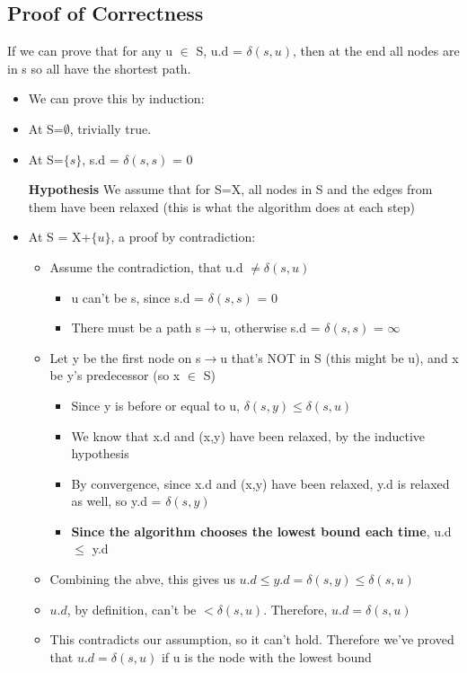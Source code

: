 \newpage
\subsection{Proof of Correctness}
If we can prove that for any u $\in$ S, u.d = $\delta(s,u)$, then at the end all nodes are in s so all have the shortest path.
\begin{itemize}
    \item We can prove this by induction:
    \item At S=$\emptyset$, trivially true.
    \item At S=$\{s\}$, s.d = $\delta(s,s)$ = 0
    \item [\textbf{Hypothesis}]We assume that for S=X, all nodes in S and the edges from them have been relaxed (this is what the algorithm does at each step)
    \item At S = X+$\{u\}$, a proof by contradiction:
    \begin{itemize}
        \item Assume the contradiction, that u.d $\neq \delta(s,u)$
        \begin{itemize}
            \item u can't be s, since s.d = $\delta(s,s)$ = 0
            \item There must be a path s$\rightarrow$u, otherwise s.d = $\delta(s,s)$ = $\infty$
        \end{itemize}
        \item Let y be the first node on s$\rightarrow$u that's NOT in S (this might be u), and x be y's predecessor (so x $\in$ S)
        \begin{itemize}
            \item Since y is before or equal to u, $\delta(s,y) \leq \delta(s,u)$
            \item We know that x.d and (x,y) have been relaxed, by the inductive hypothesis
            \item By convergence, since x.d and (x,y) have been relaxed, y.d is relaxed as well, so y.d = $\delta(s,y)$            
            \item \textbf{Since the algorithm chooses the lowest bound each time}, u.d $\leq$ y.d
        \end{itemize}
        \item Combining the abve, this gives us \(u.d \leq y.d = \delta(s,y) \leq \delta(s,u) \)
        \item $u.d$, by definition, can't be $< \delta(s,u)$. Therefore, $u.d = \delta(s,u)$
        \item This contradicts our assumption, so it can't hold. Therefore we've proved that $u.d = \delta(s,u)$ if u is the node with the lowest bound
    \end{itemize}
\end{itemize}

